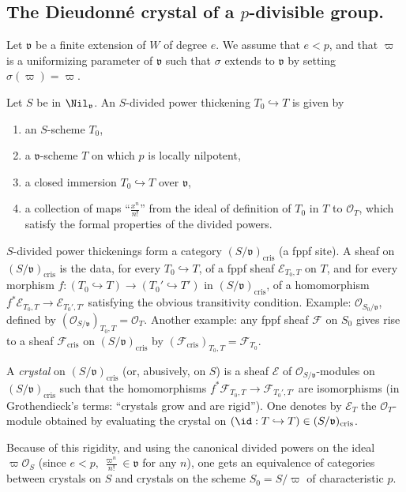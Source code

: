 \subsection{The Dieudonn\'e crystal of a $p$-divisible group.}\label{sub:3.2}

\begin{para}\label{para:3.2.1} Let $\mathfrak{v}$ be a finite extension of
 $W$ of degree $e$. We assume that $e<p$, and that $\varpi$ is a 
 uniformizing parameter of $\mathfrak{v}$ such that $\sigma$ extends to 
 $\mathfrak{v}$ by setting $\sigma(\varpi)=\varpi$.


Let $S$ be in $\Nil_\mathfrak{v}$. An
$S$-divided power thickening
$T_0\hookrightarrow T$ is given by
\begin{enumerate}
 \item an $S$-scheme $T_0$,
 \item a $\mathfrak{v}$-scheme $T$ on which $p$ is locally nilpotent,
 \item a closed immersion $T_0\hookrightarrow T$ over $\mathfrak{v}$,
 \item a collection of maps ``$\frac{x^n}{n!}$'' from the ideal of
 definition of $T_0$ in $T$ to $\mathcal{O}_T$, which 
 satisfy the formal properties of the divided powers. 
\end{enumerate}

 $S$-divided power thickenings form a category
 $(S/\mathfrak{v})_{\mathrm{cris}}$ (a fppf site). A sheaf on
 $(S/\mathfrak{v})_{\mathrm{cris}}$ is the data, for every
 $T_0\hookrightarrow T$, of a fppf sheaf $\mathcal{E}_{T_0,T}$ on $T$,
 and for every morphism $f: (T_0\hookrightarrow T)\rightarrow
 (T_0'\hookrightarrow T')$ in $(S/\mathfrak{v})_{\mathrm{cris}}$, of a
 homomorphism $f^\ast\mathcal{E}_{T_0,T}\rightarrow
 \mathcal{E}_{T_0',T'}$ satisfying the obvious transitivity
 condition. Example: $\mathcal{O}_{S_0/\mathfrak{v}}$, defined by
 $(\mathcal{O}_{S/\mathfrak{v}})_{T_0,T}=\mathcal{O}_T$. Another example:
 any fppf sheaf $\mathcal{F}$ on $S_0$ gives rise to a sheaf
 $\mathcal{F}_{\mathrm{cris}}$ on $(S/\mathfrak{v})_{\mathrm{cris}}$ by
 $(\mathcal{F}_{\mathrm{cris}})_{T_0,T}=\mathcal{F}_{T_0}$.

 A {\it crystal} on $(S/\mathfrak{v})_{\mathrm{cris}}$ (or,
 abusively, on $S$) is a sheaf $\mathcal{E}$ of
 $\mathcal{O}_{S/\mathfrak{v}}$-modules on
 $(S/\mathfrak{v})_{\mathrm{cris}}$ such that the homomorphisms
 $f^\ast\mathcal{F}_{T_0,T}\rightarrow \mathcal{F}_{T_0',T'}$ are
 isomorphisms (in Grothendieck's terms: ``crystals grow and are
 rigid''). One denotes by $\mathcal{E}_T$ the $\mathcal{O}_T$-module
 obtained by evaluating the crystal on $(\id: T\hookrightarrow T) \in
 (S/\mathfrak{v})_{\mathrm{cris}}$.

 Because of this rigidity, and using the canonical divided powers on the
 ideal $\varpi\mathcal{O}_S$ (since $e<p,\;\frac{\varpi^n}{n!}\in
 \mathfrak{v}$ for any $n$), one gets an equivalence of categories
 between crystals on $S$ and crystals on the scheme $S_0=S/\varpi$ of
 characteristic $p$.
\end{para}

